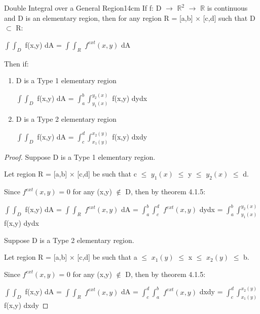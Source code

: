     \vspace{0.5cm}



    \begin{wtheorem}{Double Integral over a General Region}{14cm}
        If f: D $\rightarrow$ $\mathbb{R}^2$ $\rightarrow$ $\mathbb{R}$
        is continuous and D is an elementary region, then
        for any region R = [a,b] $\times$ [c,d] such that D $\subset$ R:

        \hspace{0.5cm}
        $\int \int_D$ f(x,y) dA
        = $\int \int_R$ $f^{ext}(x,y)$ dA

        Then if:

        \begin{enumerate}[label=(\alph*), leftmargin=1cm, itemsep=0.1cm]
            \item D is a Type 1 elementary region
            
                \hspace{0.5cm}
                $\int \int_D$ f(x,y) dA
                = $\int_a^b \int_{y_1(x)}^{y_2(x)}$ f(x,y) dydx

            \item D is a Type 2 elementary region
            
                \hspace{0.5cm}
                $\int \int_D$ f(x,y) dA
                = $\int_c^d \int_{x_1(y)}^{x_2(y)}$ f(x,y) dxdy
        \end{enumerate}
    \end{wtheorem}

    \begin{proof}
        Suppose D is a Type 1 elementary region.

        Let region R = [a,b] $\times$ [c,d] be such that
        c $\leq$ $y_1(x)$ $\leq$ y $\leq$ $y_2(x)$ $\leq$ d.

        Since $f^{ext}(x,y)$ = 0 for any
        (x,y) $\not \in$ D, then by {\color{red} theorem 4.1.5}:

        \hspace{0.2cm}
        $\int \int_D$ f(x,y) dA
        = $\int \int_R$ $f^{ext}(x,y)$ dA
        = $\int_a^b \int_c^d$ $f^{ext}(x,y)$ dydx
        = $\int_a^b \int_{y_1(x)}^{y_2(x)}$ f(x,y) dydx

        \vspace{0.3cm}

        Suppose D is a Type 2 elementary region.

        Let region R = [a,b] $\times$ [c,d] be such that
        a $\leq$ $x_1(y)$ $\leq$ x $\leq$ $x_2(y)$ $\leq$ b.

        Since $f^{ext}(x,y)$ = 0 for any
        (x,y) $\not \in$ D, then by {\color{red} theorem 4.1.5}:

        \hspace{0.2cm}
        $\int \int_D$ f(x,y) dA
        = $\int \int_R$ $f^{ext}(x,y)$ dA
        = $\int_c^d \int_a^b$ $f^{ext}(x,y)$ dxdy
        = $\int_c^d \int_{x_1(y)}^{x_2(y)}$ f(x,y) dxdy
    \end{proof}

